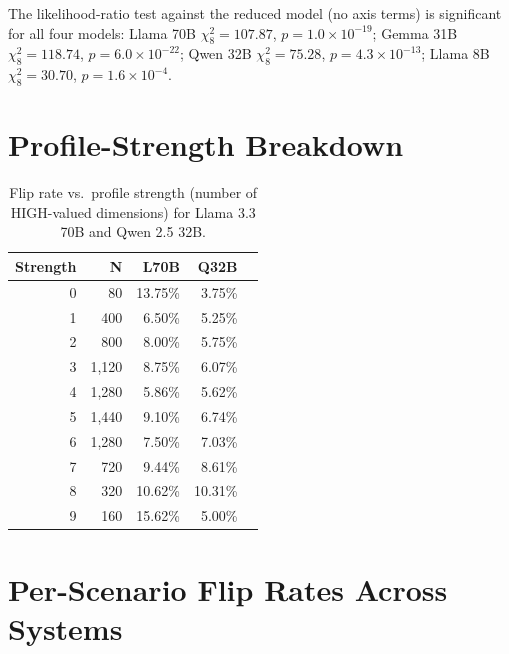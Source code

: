 \documentclass[11pt]{article}
\begin{document}
The likelihood-ratio test against the reduced model (no axis terms) is significant for all four models: Llama 70B $\chi^2_8 = 107.87$, $p=1.0\!\times\!10^{-19}$; Gemma 31B $\chi^2_8 = 118.74$, $p=6.0\!\times\!10^{-22}$; Qwen 32B $\chi^2_8 = 75.28$, $p=4.3\!\times\!10^{-13}$; Llama 8B $\chi^2_8 = 30.70$, $p=1.6\!\times\!10^{-4}$.

\section{Profile-Strength Breakdown}
\label{app:strength}

\begin{table}[H]
\centering\small
\caption{Flip rate vs.\ profile strength (number of HIGH-valued dimensions) for Llama 3.3 70B and Qwen 2.5 32B.}
\label{tab:strength}
\begin{tabular}{rrrrr}
\toprule
\textbf{Strength} & \textbf{N} & \textbf{L70B} & \textbf{Q32B} & \\
\midrule
0  &    80 & 13.75\% &  3.75\% \\
1  &   400 &  6.50\% &  5.25\% \\
2  &   800 &  8.00\% &  5.75\% \\
3  & 1{,}120 &  8.75\% &  6.07\% \\
4  & 1{,}280 &  5.86\% &  5.62\% \\
5  & 1{,}440 &  9.10\% &  6.74\% \\
6  & 1{,}280 &  7.50\% &  7.03\% \\
7  &   720 &  9.44\% &  8.61\% \\
8  &   320 & 10.62\% & 10.31\% \\
9  &   160 & 15.62\% &  5.00\% \\
\bottomrule
\end{tabular}
\end{table}

\section{Per-Scenario Flip Rates Across Systems}
\label{app:scenario}
\end{document}
